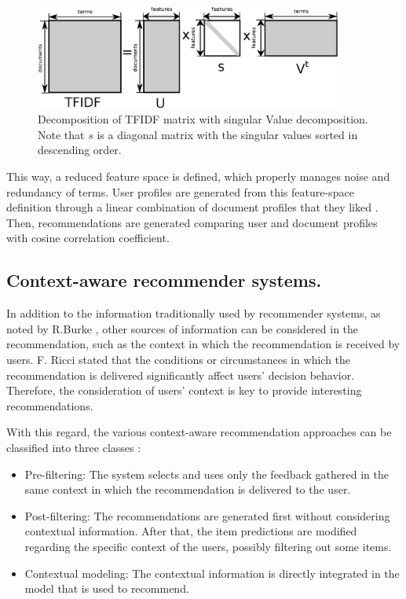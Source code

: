 \documentclass[preprint]{elsarticle}
\begin{document}
\begin{spacing}{1.5}
\begin{figure}[h]
	\centering
	\includegraphics[width=0.9\textwidth]{figures/svd-scheme.eps}
	\caption{Decomposition of TFIDF matrix with singular Value decomposition. Note that $s$ is a diagonal matrix with the singular values sorted in descending order.}
	\label{fig:svd-scheme}
\end{figure}

This way, a reduced feature space is defined, which properly manages noise and redundancy of terms. User profiles are generated from this feature-space definition through a linear combination of document profiles that they liked \cite{Bambini2011}. Then, recommendations are generated comparing user and document profiles with cosine correlation coefficient.

\subsection{Context-aware recommender systems.}

In addition to the information traditionally used by recommender systems, as noted by R.Burke \cite{Burke2002}, other sources of information can be considered in the recommendation, such as the context in which the recommendation is received by users. F. Ricci \cite{Ricci2012contextualizing} stated that the conditions or circumstances in which the recommendation is delivered significantly affect users' decision behavior. Therefore, the consideration of users' context is key to provide interesting recommendations.

With this regard, the various context-aware recommendation approaches can be classified into three classes \cite{Adomavicius2011}:
\begin{itemize}
	\item Pre-filtering: The system selects and uses only the feedback gathered in the same context in which the recommendation is delivered to the user.
	\item Post-filtering: The recommendations are generated first without considering contextual information. After that, the item predictions are modified regarding the specific context of the users, possibly filtering out some items.
	\item Contextual modeling: The contextual information is directly integrated in the model that is used to recommend.
\end{itemize}


\end{spacing}
\end{document}
